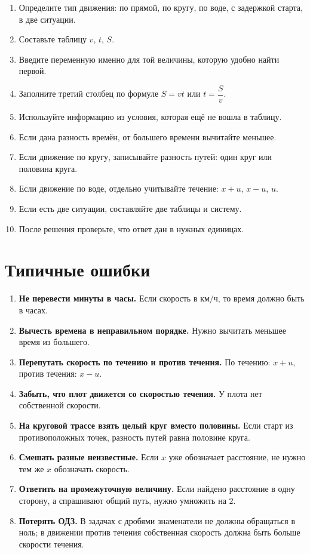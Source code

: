 \documentclass[a4paper,12pt]{article}
\newcommand{\important}[1]{\textcolor{darkaccent}{\textbf{#1}}}
\newcommand{\kmh}{\text{км/ч}}
\begin{document}
\begin{enumerate}
    \item Определите тип движения: по прямой, по кругу, по воде, с задержкой старта, в две ситуации.
    \item Составьте таблицу $v$, $t$, $S$.
    \item Введите переменную именно для той величины, которую удобно найти первой.
    \item Заполните третий столбец по формуле $S=vt$ или $t=\dfrac{S}{v}$.
    \item Используйте информацию из условия, которая ещё не вошла в таблицу.
    \item Если дана разность времён, от большего времени вычитайте меньшее.
    \item Если движение по кругу, записывайте разность путей: один круг или половина круга.
    \item Если движение по воде, отдельно учитывайте течение: $x+u$, $x-u$, $u$.
    \item Если есть две ситуации, составляйте две таблицы и систему.
    \item После решения проверьте, что ответ дан в нужных единицах.
\end{enumerate}

\section{Типичные ошибки}

\begin{enumerate}
    \item \important{Не перевести минуты в часы.} Если скорость в $\kmh$, то время должно быть в часах.
    \item \important{Вычесть времена в неправильном порядке.} Нужно вычитать меньшее время из большего.
    \item \important{Перепутать скорость по течению и против течения.} По течению: $x+u$, против течения: $x-u$.
    \item \important{Забыть, что плот движется со скоростью течения.} У плота нет собственной скорости.
    \item \important{На круговой трассе взять целый круг вместо половины.} Если старт из противоположных точек, разность путей равна половине круга.
    \item \important{Смешать разные неизвестные.} Если $x$ уже обозначает расстояние, не нужно тем же $x$ обозначать скорость.
    \item \important{Ответить на промежуточную величину.} Если найдено расстояние в одну сторону, а спрашивают общий путь, нужно умножить на $2$.
    \item \important{Потерять ОДЗ.} В задачах с дробями знаменатели не должны обращаться в ноль; в движении против течения собственная скорость должна быть больше скорости течения.
\end{enumerate}
\end{document}

